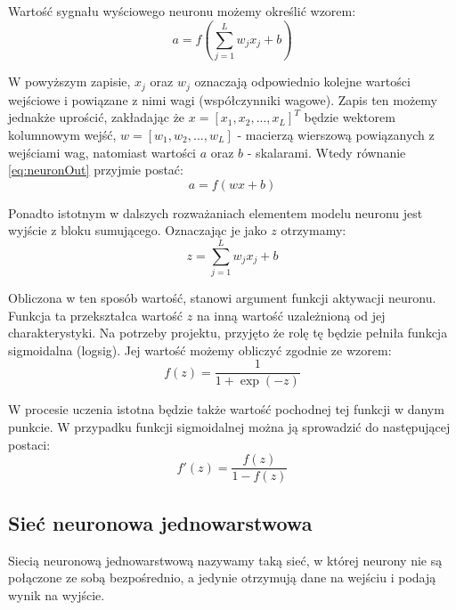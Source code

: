 \documentclass[12pt,twoside]{article}
\begin{document}
Wartość sygnału wyściowego neuronu możemy określić wzorem:
\begin{equation}
	\label{eq:neuronOut}
	a = f\left(\sum\limits_{j=1}^{L}w_{j}x_{j} + b\right)
\end{equation}

W powyższym zapisie, $x_j$ oraz $w_j$ oznaczają odpowiednio kolejne wartości wejściowe i powiązane z nimi wagi (współczynniki wagowe).
Zapis ten możemy jednakże uprościć, zakładając że $x = \left[ x_1, x_2, ..., x_L\right]^T$ będzie wektorem kolumnowym wejść, $w = \left[ w_1, w_2, ..., w_L\right]$ - macierzą wierszową powiązanych z wejściami wag, natomiast wartości $a$ oraz $b$ - skalarami.
Wtedy równanie \ref{eq:neuronOut} przyjmie postać:
\begin{equation}
	\label{eq:neuronVec}
	a = f\left( w x + b \right)
\end{equation}

Ponadto istotnym w dalszych rozważaniach elementem modelu neuronu jest wyjście z bloku sumującego.
Oznaczając je jako $z$ otrzymamy:
\begin{equation}
	\label{eq:z}
	z = \sum\limits_{j=1}^{L}w_{j}x_{j} + b
\end{equation}

Obliczona w ten sposób wartość, stanowi argument funkcji aktywacji neuronu.
Funkcja ta przekształca wartość $z$ na inną wartość uzależnioną od jej charakterystyki.
Na potrzeby projektu, przyjęto że rolę tę będzie pełniła funkcja sigmoidalna (logsig).
Jej wartość możemy obliczyć zgodnie ze wzorem:
\begin{equation}
	\label{eq:sigmoid}
	f(z) =  \frac{1}{1 +\exp(-z)}
\end{equation}

W procesie uczenia istotna będzie także wartość pochodnej tej funkcji w danym punkcie.
W przypadku funkcji sigmoidalnej można ją sprowadzić do następującej postaci:
\begin{equation}
	\label{eq:sigmoidPrime}
	f'(z) = \frac{f(z)}{1-f(z)}
\end{equation}


\subsection{Sieć neuronowa jednowarstwowa}
Siecią neuronową jednowarstwową nazywamy taką sieć, w której neurony nie są połączone ze sobą bezpośrednio, a jedynie otrzymują dane na wejściu i podają wynik na wyjście.
\end{document}
